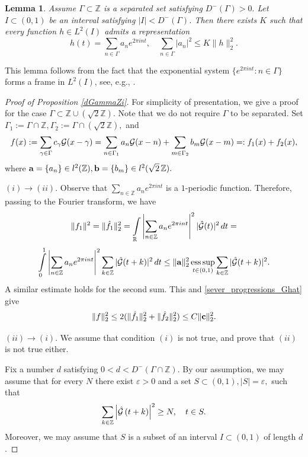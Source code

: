 \documentclass[12pt]{amsart}
\numberwithin{equation}{section}
\newtheorem{lemma}[theorem]{Lemma}
\newcommand{\R}{{\mathbb R}} \newcommand{\Q}{{\mathbb Q}} \newcommand{\Z}{{\mathbb Z}} \newcommand{\N}{{\mathbb N}}
\DeclareMathOperator*{\ess}{ess\,sup}
\begin{document}
\begin{lemma}\label{lem_s1}
    Assume $\Gamma\subset\Z$ is  a separated set satisfying $D^-(\Gamma)>0.$ Let $I\subset (0,1)$ be an interval satisfying $|I|<D^-(\Gamma)$. Then there exists  $K$ such that every function $h\in L^2(I)$
    admits a representation
    $$h(t)=\sum_{n\in\Gamma}a_ne^{2\pi i n t},\quad  \sum_{n\in\Gamma}|a_n|^2\leq K\|h\|_2^2.$$
\end{lemma}

This lemma follows from the fact that the exponential system $\{e^{2\pi i n t}:n\in\Gamma\}$ forms a frame in $L^2(I)$, see, e.g., \cite[Lecture~3]{ou}.

\begin{proof}[Proof of Proposition \ref{dGammaZi}]
For simplicity of presentation, we give a proof for the case $\Gamma \subset \Z \cup (\sqrt{2} \Z)$. Note that we do not require  $\Gamma$ to be separated.
Set $\Gamma_1:= \Gamma \cap \Z, \Gamma_2:= \Gamma \cap (\sqrt{2}\Z), $ and 
$$
f(x) := \sum_{\gamma \in \Gamma} c_{\gamma} \mathcal{G}(x - \gamma) = \sum_{n \in \Gamma_1} a_{n} \mathcal{G}(x - n) + \sum_{m \in \Gamma_2} b_{m} \mathcal{G}(x -m)=:f_1(x)+f_2(x),$$ where ${\bf a}=\{a_n\} \in l^2(\Z), {\bf b}=\{b_m\}\in l^2(\sqrt2\,\Z). 
$

$(i) \rightarrow (ii)$.
Observe that $\sum\limits_{n \in \Z} a_n e^{2 \pi i n t}$ is a $1$-periodic function. Therefore, 
passing to the Fourier transform, we have $$
\|f_1\|^2=\|\hat f_1\|_2^2=  \int\limits_{\R} \left|\sum\limits_{n \in \Z} a_{n} e^{2\pi i n t}\right|^2 |\hat{\Ff}(t)|^2 \, dt =$$ \begin{equation}\label{eqst}\int\limits_{0}^1 \left|\sum\limits_{n \in \Z} a_{n} e^{2\pi i n t}\right|^2 \sum_{k \in \Z}|\hat{\Ff}(t + k)|^2 \, dt \le  \|{\bf a}\|_2^2 \ess_{t\in(0,1)}\sum_{k\in\Z}|\hat\Ff(t+k)|^2. \end{equation}
A similar estimate holds for the second sum. 
This and \eqref{sever_progressions_Ghat} give
$$
\|f\|^2_2 \leq 2( \|\hat{f_1}\|^2_2+\|\hat{f_2}\|^2_2)  \le C\|{\bf c}\|^2_2.
$$

$(ii) \rightarrow (i)$. We assume that condition $(i)$ is not true, and prove that $(ii)$ is not true either.

Fix a number $d$ satisfying $0<d<D^-(\Gamma\cap\Z)$.
By our assumption, we may assume that  for every $N$ there exist $\varepsilon>0$ and a set $S\subset (0,1),|S|=\varepsilon,$ such that $$ \sum\limits_{k \in \Z} \left|\hat{\Ff}\left(t + k \right)\right|^2  \ge N, \quad t\in S.$$ Moreover, we may assume that $S$ is a subset of an interval $I\subset(0,1)$ of length $d$. 


\end{proof}
\end{document}
